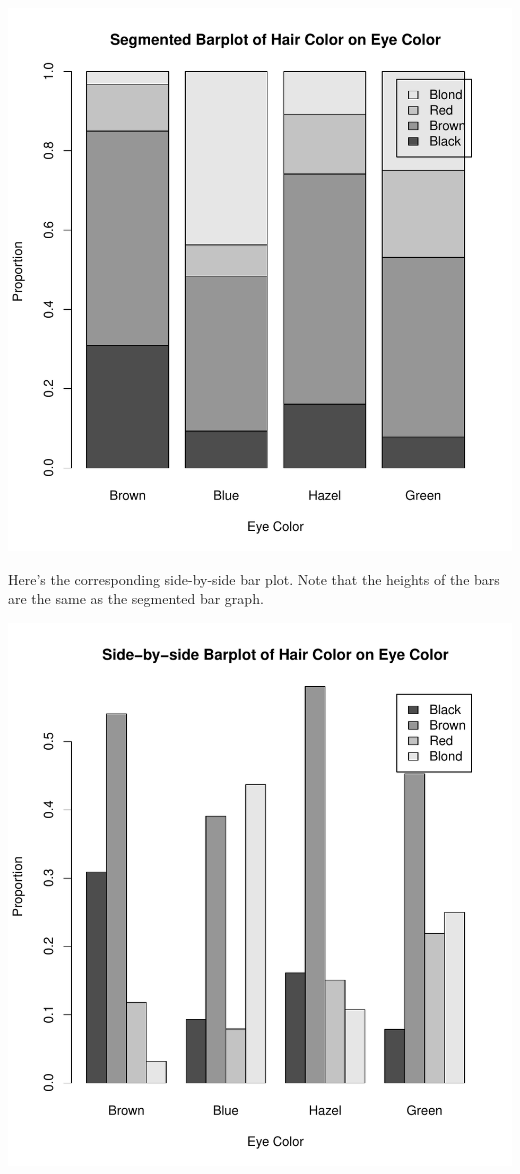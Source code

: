 \documentclass[
]{book}
\theoremstyle{definition}
\theoremstyle{definition}
\theoremstyle{definition}
\theoremstyle{definition}
\theoremstyle{remark}
\begin{document}
\includegraphics{_main_files/figure-latex/unnamed-chunk-9-1.pdf}

Here's the corresponding side-by-side bar plot. Note that the heights of
the bars are the same as the segmented bar graph.

\includegraphics{_main_files/figure-latex/unnamed-chunk-10-1.pdf}
\end{document}
